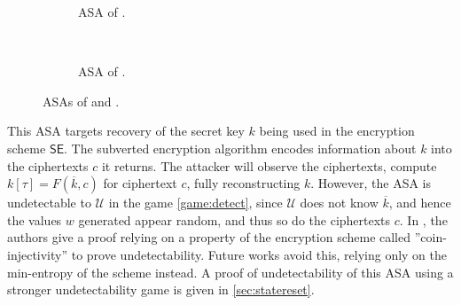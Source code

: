 \begin{figure}
\centering
\begin{subfigure}[t]{0.5\textwidth}
\centering
{}
\caption{ASA of \cite{C:BelPatRog14}.}
\label{figure:bprsubv}
\end{subfigure}~~\vrule~~~
\begin{subfigure}[t]{0.5\textwidth}
\centering
{}
\caption{ASA of \cite{CCS:BelJaeKan15}.}
\label{figure:bjksubv}
\end{subfigure}
\caption[ASAs of \cite{C:BelPatRog14} and \cite{CCS:BelJaeKan15}]{ASAs of \cite{C:BelPatRog14} and \cite{CCS:BelJaeKan15}.}
\label{figure:bprandbjk}
\end{figure}

This ASA targets recovery of the secret key $k$ being used in the encryption scheme $\mathsf{SE}$. The subverted encryption algorithm encodes information about $k$ into the ciphertexts $c$ it returns. The attacker will observe the ciphertexts, compute $k[\tau]=F(\overline{k}, c)$ for ciphertext $c$, fully reconstructing $k$. However, the ASA is undetectable to $\mathcal{U}$ in the game \autoref{game:detect}, since $\mathcal{U}$ does not know $\overline{k}$, and hence the values $w$ generated appear random, and thus so do the ciphertexts $c$. In \cite{C:BelPatRog14}, the authors give a proof relying on a property of the encryption scheme called ''coin-injectivity'' to prove undetectability. Future works avoid this, relying only on the min-entropy of the scheme instead. A proof of undetectability of this ASA using a stronger undetectability game is given in \autoref{sec:statereset}.

